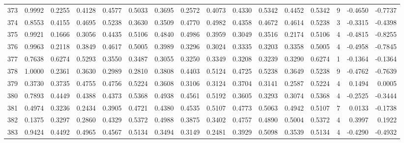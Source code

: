 \begin{tabular}{lrrrrrrrrrrrrrrr}
373 &      0.9992 &  0.2255 &  0.4128 &  0.4577 &  0.5033 &  0.3695 &  0.2572 &  0.4073 &  0.4330 &  0.5342 &   0.4452 &     0.5342 &      9 &                   -0.4650 &                    -0.7737 \\
374 &      0.8553 &  0.4155 &  0.4695 &  0.5238 &  0.3630 &  0.3509 &  0.4770 &  0.4982 &  0.4358 &  0.4672 &   0.4614 &     0.5238 &      3 &                   -0.3315 &                    -0.4398 \\
375 &      0.9921 &  0.1666 &  0.3056 &  0.4435 &  0.5106 &  0.4840 &  0.4986 &  0.3959 &  0.3049 &  0.3516 &   0.2174 &     0.5106 &      4 &                   -0.4815 &                    -0.8255 \\
376 &      0.9963 &  0.2118 &  0.3849 &  0.4617 &  0.5005 &  0.3989 &  0.3296 &  0.3024 &  0.3335 &  0.3203 &   0.3358 &     0.5005 &      4 &                   -0.4958 &                    -0.7845 \\
377 &      0.7638 &  0.6274 &  0.5293 &  0.3550 &  0.3487 &  0.3055 &  0.3250 &  0.3349 &  0.3208 &  0.3239 &   0.3290 &     0.6274 &      1 &                   -0.1364 &                    -0.1364 \\
378 &      1.0000 &  0.2361 &  0.3630 &  0.2989 &  0.2810 &  0.3808 &  0.4403 &  0.5124 &  0.4725 &  0.5238 &   0.3649 &     0.5238 &      9 &                   -0.4762 &                    -0.7639 \\
379 &      0.3730 &  0.3735 &  0.4755 &  0.4756 &  0.5224 &  0.3608 &  0.3106 &  0.3124 &  0.3704 &  0.3141 &   0.2587 &     0.5224 &      4 &                    0.1494 &                     0.0005 \\
380 &      0.7893 &  0.4449 &  0.4388 &  0.4373 &  0.5368 &  0.4938 &  0.4561 &  0.5192 &  0.3605 &  0.3293 &   0.3074 &     0.5368 &      4 &                   -0.2525 &                    -0.3444 \\
381 &      0.4974 &  0.3236 &  0.2434 &  0.3905 &  0.4721 &  0.4380 &  0.4535 &  0.5107 &  0.4773 &  0.5063 &   0.4942 &     0.5107 &      7 &                    0.0133 &                    -0.1738 \\
382 &      0.1375 &  0.3297 &  0.2860 &  0.4329 &  0.5372 &  0.4988 &  0.3875 &  0.3402 &  0.4757 &  0.4890 &   0.5004 &     0.5372 &      4 &                    0.3997 &                     0.1922 \\
383 &      0.9424 &  0.4492 &  0.4965 &  0.4567 &  0.5134 &  0.3494 &  0.3149 &  0.2481 &  0.3929 &  0.5098 &   0.3539 &     0.5134 &      4 &                   -0.4290 &                    -0.4932 \\

\end{tabular}
